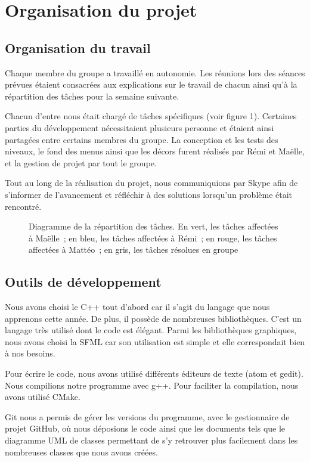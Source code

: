 \chapter{Organisation du projet}

\section{Organisation du travail}

Chaque membre du groupe a travaillé en autonomie. Les réunions lors des séances
prévues étaient consacrées aux explications sur le travail de chacun ainsi qu'à
la répartition des tâches pour la semaine suivante.

Chacun d'entre nous était chargé de tâches spécifiques (voir figure 1).
Certaines parties du développement nécessitaient plusieurs personne et
étaient ainsi partagées entre certains membres du groupe. La conception
et les tests des niveaux, le fond des menus ainsi que les décors furent
réalisés par Rémi et Maëlle, et la gestion de projet par tout le groupe.

Tout au long de la réalisation du projet, nous communiquions par Skype
afin de s'informer de l'avancement et réfléchir à des solutions lorsqu'un
problème était rencontré.

\begin{figure}[p!]
    
    \caption{
        Diagramme de la répartition des tâches. En vert, les tâches
        affectées à Maëlle~; en bleu, les tâches affectées à Rémi~;
        en rouge, les tâches affectées à Mattéo~; en gris, les
        tâches résolues en groupe
    }
    \label{fig:organisation-gantt}
\end{figure}
\restoregeometry

\section{Outils de développement}

Nous avons choisi le C++ tout d'abord car il s'agit du langage que nous
apprenons cette année. De plus, il possède de nombreuses bibliothèques.
C'est un langage très utilisé dont le code est élégant. Parmi les bibliothèques
graphiques, nous avons choisi la SFML car son utilisation est simple et
elle correspondait bien à nos besoins.

Pour écrire le code, nous avons utilisé différents éditeurs de texte
(atom et gedit). Nous compilions notre programme avec g++. Pour faciliter
la compilation, nous avons utilisé CMake.

Git nous a permis de gérer les versions du programme, avec le gestionnaire
de projet GitHub, où nous déposions le code ainsi que les documents tels
que le diagramme UML de classes permettant de s'y retrouver plus facilement
dans les nombreuses classes que nous avons créées.
